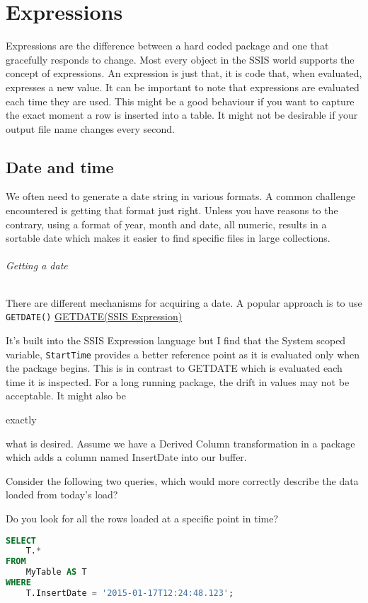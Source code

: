 \part{Expressions}
\label{part:Expressions}
Expressions are the difference between a hard coded package and one that gracefully responds to change. Most every object
in the SSIS world supports the concept of expressions. An expression is just that, it is code that, when evaluated, expresses a new value. It can be important to note that expressions are evaluated each time they are used. This might be a good behaviour if you want to capture the exact moment a row is inserted into a table. It might not be desirable if your output file name changes 
every second.


\chapter{Date and time}
\label{chap:Date and time}
We often need to generate a date string in various formats. A common challenge encountered is getting that format just right.
Unless you have reasons to the contrary, using a format of year, month and date, all numeric, results in a sortable date which 
makes it easier to find specific files in large collections.

\paragraph{Getting a date}
\label{par:Getting a date}
There are different mechanisms for acquiring a date. A popular approach is to use \verb+GETDATE()+ \href{http://msdn.microsoft.com/en-us/library/ms139875.aspx}{GETDATE(SSIS Expression)}

It's built into the SSIS Expression language but I find that the System scoped variable, \verb+StartTime+ provides a better reference point as it is evaluated only when the package begins. This is in contrast to GETDATE which is evaluated each time it is inspected. For a long running package, the drift in values may not be acceptable. It might also be \begin{em}exactly\end{em} what is desired. Assume we have a Derived Column transformation in a package which adds a column named InsertDate into our buffer. 

Consider the following two queries, which would more correctly describe the data loaded from today's load?

Do you look for all the rows loaded at a specific point in time?
\begin{lstlisting}[language=SQL]
SELECT 
    T.*
FROM 
    MyTable AS T
WHERE 
    T.InsertDate = '2015-01-17T12:24:48.123'; 
\end{lstlisting}

